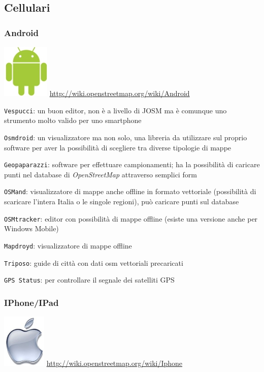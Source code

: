 \documentclass[a4paper,twoside,12pt,]{article}
\newcommand{\osm}{\emph{OpenStreetMap}\xspace}
\newcommand{\soft}[1]{\texttt{#1}}
\begin{document}
\subsection{Cellulari}
\subsubsection{Android} 
\includegraphics{./android-logo.jpg} \url{http://wiki.openstreetmap.org/wiki/Android}

\soft{Vespucci}: un buon editor, non è a livello di JOSM ma è comunque uno strumento molto valido per uno smartphone

\soft{Osmdroid}: un visualizzatore ma non solo, una libreria da utilizzare sul proprio software per aver la possibilità di scegliere tra diverse tipologie di mappe

\soft{Geopaparazzi}: software per effettuare campionamenti; ha la possibilità di caricare punti nel database di \osm attraverso semplici form 

\soft{OSMand}: visualizzatore di mappe anche offline in formato vettoriale (possibilità di scaricare l'intera Italia o le singole regioni), può caricare punti sul database

\soft{OSMtracker}: editor con possibilità di mappe offline (esiste una versione anche per Windows Mobile)

\soft{Mapdroyd}: visualizzatore di mappe offline

\soft{Triposo}: guide di città con dati osm vettoriali precaricati

\soft{GPS Status}: per controllare il segnale dei satelliti GPS

\subsubsection{IPhone/IPad}
\includegraphics{./iphone-logo.jpg} \url{http://wiki.openstreetmap.org/wiki/Iphone}
\end{document}
